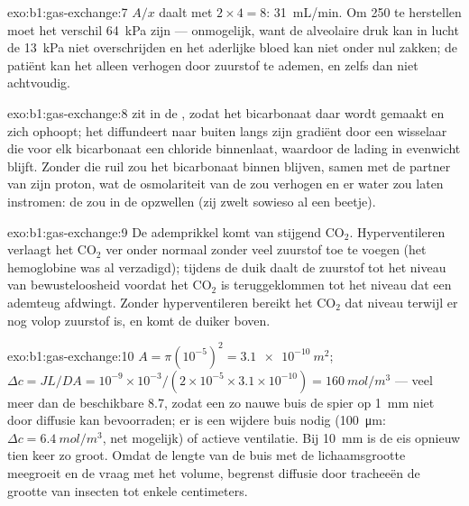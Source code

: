 \begin{solution}{exo:b1:gas-exchange:7}
$A/x$ daalt met $2\times 4 = 8$: \qty{31}{mL/min}. Om \qty{250}{} te
herstellen moet het verschil \qty{64}{kPa} zijn --- onmogelijk, want de
alveolaire druk kan in lucht de \qty{13}{kPa} niet overschrijden en het
aderlijke bloed kan niet onder nul zakken; de patiënt kan het alleen
verhogen door zuurstof te ademen, en zelfs dan niet achtvoudig.
\end{solution}

\begin{solution}{exo:b1:gas-exchange:8}
 zit in de , zodat het bicarbonaat daar wordt gemaakt
en zich ophoopt; het diffundeert naar buiten langs zijn gradiënt door een
wisselaar die voor elk bicarbonaat een chloride binnenlaat, waardoor de
lading in evenwicht blijft. Zonder die ruil zou het bicarbonaat binnen
blijven, samen met de partner van zijn proton, wat de osmolariteit van de
 zou verhogen en er water zou laten instromen: de  zou in de
 opzwellen (zij zwelt sowieso al een beetje).
\end{solution}

\begin{solution}{exo:b1:gas-exchange:9}
De ademprikkel komt van stijgend $\mathrm{CO_2}$. Hyperventileren verlaagt
het $\mathrm{CO_2}$ ver onder normaal zonder veel zuurstof toe te voegen
(het hemoglobine was al verzadigd); tijdens de duik daalt de zuurstof tot
het niveau van bewusteloosheid voordat het $\mathrm{CO_2}$ is teruggeklommen
tot het niveau dat een ademteug afdwingt. Zonder hyperventileren bereikt
het $\mathrm{CO_2}$ dat niveau terwijl er nog volop zuurstof is, en komt de
duiker boven.
\end{solution}

\begin{solution}{exo:b1:gas-exchange:10}
$A = \pi(10^{-5})^2 = \qty{3.1e-10}{m^2}$; $\Delta c = JL/DA =
10^{-9}\times 10^{-3}/(2\times 10^{-5}\times 3.1\times 10^{-10}) =
\qty{160}{mol/m^3}$ --- veel meer dan de beschikbare \qty{8.7}{}, zodat
een zo nauwe buis de spier op \qty{1}{mm} niet door diffusie kan
bevoorraden; er is een wijdere buis nodig (\qty{100}{\micro m}:
$\Delta c = \qty{6.4}{mol/m^3}$, net mogelijk) of actieve ventilatie. Bij
\qty{10}{mm} is de eis opnieuw tien keer zo groot. Omdat de lengte van de
buis met de lichaamsgrootte meegroeit en de vraag met het volume, begrenst
diffusie door tracheeën de grootte van insecten tot enkele centimeters.
\end{solution}

